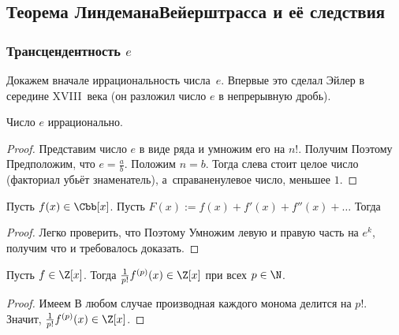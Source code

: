 \documentclass[a4paper]{article}
\begin{document}
\subsection{Теорема Линдемана\ч Вейерштрасса и её следствия}

\subsubsection{Трансцендентность $e$}

Докажем вначале иррациональность числа~$e$. Впервые это сделал Эйлер в середине XVIII~века (он разложил число $e$ в
непрерывную дробь).

\begin{theorem}[Фурье, 1815~г.]
Число $e$ иррационально.
\end{theorem}
\begin{proof} Представим число $e$ в виде ряда и умножим его на $n!$. Получим
Поэтому
Предположим, что $e=\frac ab$. Положим $n = b$. Тогда слева стоит целое число (факториал убьёт знаменатель),
а~справа\т ненулевое число, меньшее $1$.
\end{proof}

\begin{lemma}
Пусть $f(x)\in\Cbb[x]$. Пусть
$F(x):=f(x)+f'(x)+f''(x)+\ldots$ Тогда
\end{lemma}
\begin{proof}
Легко проверить, что
Поэтому
Умножим левую и правую часть на $e^k$, получим
что и требовалось доказать.
\end{proof}

\begin{lemma}\label{divDerLemma}
Пусть $f \in \Z[x]$. Тогда $\frac{1}{p!}f^{(p)}(x) \in \Z[x]$ при всех $p \in \N$.
\end{lemma}
\begin{proof}
Имеем
В любом случае производная каждого монома делится на $p!$. Значит, $\frac1{p!}f^{(p)}(x)\in\Z[x]$.
\end{proof}
\end{document}
